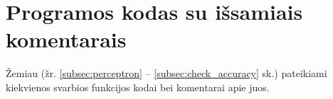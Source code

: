 \section{Programos kodas su išsamiais komentarais}

Žemiau (žr. \ref{subsec:perceptron} – \ref{subsec:check_accuracy} sk.) pateikiami kiekvienos svarbios funkcijos kodai bei komentarai apie juos.



